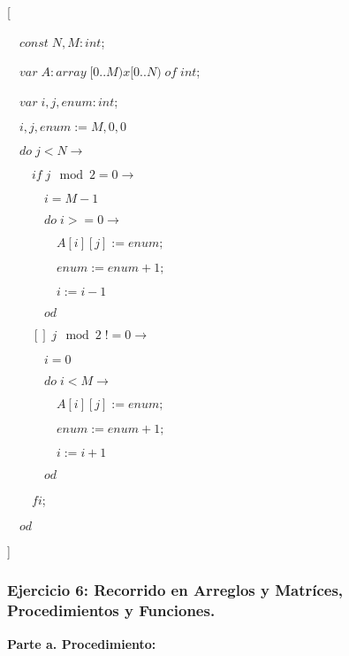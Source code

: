 \documentclass[hidelinks]{article}
\begin{document}
	[ \par
$\quad const \; N, M : int$; \par
$\quad var \; A : array \; [0..M)x[0..N) \; of \; int$; \par
		$\quad var \; i,j, enum : int$; \par
		$\quad i, j, enum := M, 0, 0 $ \par
		$\quad do \; j < N \rightarrow $ \par
		$\qquad if \; j \mod 2 = 0 \rightarrow $ \par
		$\qquad \quad i = M-1 $ \par
		$\qquad \quad do \; i >= 0 \rightarrow $ \par
		$\qquad \quad \quad A[i][j] := enum; $ \par
		$\qquad \quad \quad enum := enum + 1; $ \par
		$\qquad \quad \quad i := i - 1 $ \par
		$\qquad \quad od $ \par
		$\qquad [] \; j \mod 2 \; != 0 \rightarrow $ \par
		$\qquad \quad i = 0 $ \par
		$\qquad \quad do \; i < M \rightarrow $ \par
		$\qquad \quad \quad A[i][j] := enum; $ \par
		$\qquad \quad \quad enum := enum + 1; $ \par
		$\qquad \quad \quad i := i + 1 $ \par
		$\qquad \quad od $ \par
		$\qquad fi $; \par
		$\quad od$ \par
	] \par

\newpage

\subsubsection{Ejercicio 6: Recorrido en Arreglos y Matríces, Procedimientos y Funciones.}


\textbf{Parte a. Procedimiento:}
\end{document}
